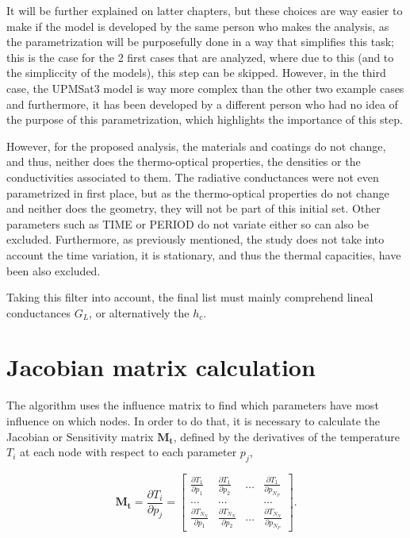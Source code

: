 It will be further explained on latter chapters, but these choices are way easier to make if the model is developed by the same person who makes the analysis, as the parametrization will be purposefully done in a way that simplifies this task; this is the case for the 2 first cases that are analyzed, where due to this (and to the simpliccity of the models), this step can be skipped. However, in the third case, the UPMSat3 model is way more complex than the other two example cases and furthermore,  it has been developed by a different person who had no idea of the purpose of this parametrization, which highlights the importance of this step.

However, for the proposed analysis, the materials and coatings do not change, and thus, neither does the thermo-optical properties, the densities or the conductivities associated to them. The radiative conductances were not even parametrized in first place, but as the thermo-optical properties do not  change and neither does the geometry, they will not be part of this initial set. Other parameters such as TIME or PERIOD do not variate either so can also be excluded. Furthermore, as previously mentioned, the study does not take into account the time variation, it is stationary, and thus the thermal capacities, have been also excluded.

Taking this filter into account, the final list must mainly comprehend lineal conductances $G_L$, or alternatively the $h_c$.


\section{Jacobian matrix calculation}
The algorithm uses the influence matrix to find which parameters have most influence on which nodes. In order to do that, it is necessary to calculate the Jacobian or Sensitivity matrix $\boldsymbol{M_t}$, defined by the derivatives of the temperature $T_i$ at each node with respect to each parameter $p_j$, 

\begin{equation}
    \boldsymbol{M_t} = \frac{\partial T_i}{\partial p_j} =\left[\begin{array}{cccc}
\frac{\partial T_1}{\partial p_1}  & \frac{\partial T_1}{\partial p_2}  & \ldots & \frac{\partial T_1}{\partial p_{N_P}}  \\
\ldots & \ldots & & \ldots \\
\frac{\partial T_{N_N}}{\partial p_1}  & \frac{\partial T_{N_N}}{\partial p_2}  & \ldots & \frac{\partial T_{N_N}}{\partial p_{N_P}} 
\end{array}\right].
\end{equation}

